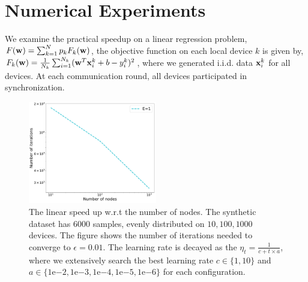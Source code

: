 


\section{Numerical Experiments}



We examine the practical speedup on a linear regression problem, 
$ F({\mathbf{w}}) = \sum_{k=1}^N p_kF_k({\mathbf{w}})$, the objective function on each local device $k$ is given by, $F_k({\mathbf{w}}) = \frac{1}{N_k} \sum_{i=1}^{N_k} ({\mathbf{w}}^T{\mathbf{x}}_i^k + b  - y_i^k)^2$, where we generated i.i.d. data ${\mathbf{x}}_i^k$ for all devices. At each communication round, all devices participated
in synchronization. 

\begin{figure}
\centering
	\includegraphics[width=0.5\textwidth]{fig/synthetic_linear_regression_1k_6k-epsilon01-logTrue.pdf}
	\caption{The linear speed up w.r.t the number of nodes. The synthetic dataset has $6000$ samples, evenly distributed on $10, 100, 1000$ devices. The figure shows the number of iterations needed to converge to $\epsilon=0.01$. The learning rate is decayed as the $\eta_t = \frac{1}{c + t \times a}$, where we extensively search the best learning rate $c \in \{1, 10\}$ and $a \in \{1\mathrm{e}{-2}, 1\mathrm{e}{-3}, 1\mathrm{e}{-4}, 1\mathrm{e}{-5}, 1\mathrm{e}{-6}\}$ for each configuration.}
\end{figure}

